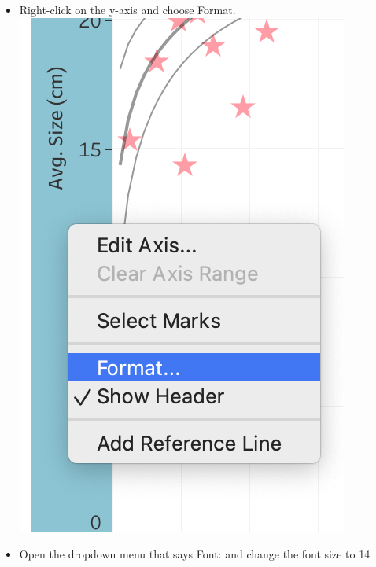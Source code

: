 \documentclass[
]{book}
\begin{document}
\begin{enumerate}
  \begin{itemize}
  \item
    Right-click on the y-axis and choose Format.
    \includegraphics{images/M3S2_format-axis.png}
  \item
    Open the dropdown menu that says Font: and change the font size to 14

\end{itemize}
\end{enumerate}
\end{document}
